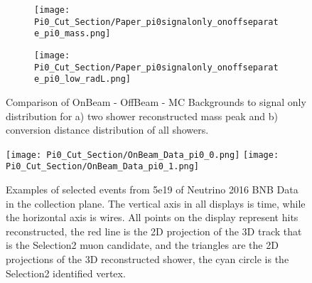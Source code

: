 \begin{figure}[h!]
\centering
  \begin{subfigure}[t]{0.3\textwidth}
    \centering
\texttt{[image: Pi0\_Cut\_Section/Paper\_pi0signalonly\_onoffseparate\_pi0\_mass.png]}
  \caption{ }
  \end{subfigure} 
  \hspace{30mm}
  \begin{subfigure}[t]{0.3\textwidth}
    \centering
\texttt{[image: Pi0\_Cut\_Section/Paper\_pi0signalonly\_onoffseparate\_pi0\_low\_radL.png]}
  \caption{ }
  \end{subfigure} 
\caption{ Comparison of OnBeam - OffBeam - MC Backgrounds to signal only distribution for a) two shower reconstructed mass peak and b) conversion distance distribution of all showers. }
\label{fig:physics_pi0signalonly_mass} 
\end{figure}


\begin{figure}[h!]
\centering
\texttt{[image: Pi0\_Cut\_Section/OnBeam\_Data\_pi0\_0.png]}
\texttt{[image: Pi0\_Cut\_Section/OnBeam\_Data\_pi0\_1.png]}
\caption{ Examples of selected events from 5e19 of Neutrino 2016 BNB Data in the collection plane. The vertical axis in all displays is time, while the horizontal axis is wires. All points on the display represent hits reconstructed, the red line is the 2D projection of the 3D track that is the Selection2 muon candidate, and the triangles are the 2D projections of the 3D reconstructed shower, the cyan circle is the Selection2 identified vertex. }
\label{fig:physics_pi0_onbeam_eventdisplays}
\end{figure}

\clearpage
